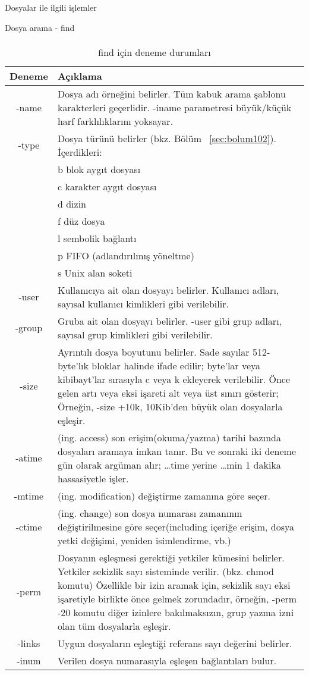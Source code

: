 \begin{section}{Dosyalar ile ilgili işlemler}
\begin{subsection}{Dosya arama - find}
\paragraph{}{
\begin {table}[H]
\caption {find için deneme durumları} \label{tab:tablo66} 
\begin{tabular}{c l}
\hline
Deneme & Açıklama \\
\hline
-name & Dosya adı örneğini belirler. Tüm kabuk arama şablonu karakterleri geçerlidir. -iname parametresi büyük/küçük harf farklılıklarını yoksayar. \\
-type & Dosya türünü belirler (bkz. Bölüm ~\ref{sec:bolum102}). İçerdikleri:\\
 & b blok aygıt dosyası\\
 & c karakter aygıt dosyası\\
 & d dizin\\
 & f düz dosya\\
 & l sembolik bağlantı\\
 & p FIFO (adlandırılmış yöneltme)\\
 & s Unix alan soketi\\
-user & Kullanıcıya ait olan dosyayı belirler. Kullanıcı adları, sayısal kullanıcı kimlikleri gibi verilebilir.\\
-group & Gruba ait olan dosyayı belirler. -user gibi grup adları, sayısal grup kimlikleri gibi verilebilir.\\
-size & Ayrıntılı dosya boyutunu belirler. Sade sayılar 512-byte'lık bloklar halinde ifade edilir; byte'lar veya kibibayt'lar sırasıyla c veya k ekleyerek verilebilir. Önce gelen artı veya eksi işareti alt veya üst sınırı gösterir; Örneğin, -size +10k, 10Kib'den büyük olan dosyalarla eşleşir.\\
-atime & (ing. access) son erişim(okuma/yazma) tarihi bazında dosyaları aramaya imkan tanır.  Bu ve sonraki iki deneme gün olarak argüman alır; …time yerine …min 1 dakika hassasiyetle işler.\\
-mtime & (ing. modification) değiştirme zamanına göre seçer.\\
-ctime & (ing. change) son dosya numarası zamanının değiştirilmesine göre seçer(including içeriğe erişim, dosya yetki değişimi, yeniden isimlendirme, vb.)\\
-perm & Dosyanın eşleşmesi gerektiği yetkiler kümesini belirler. Yetkiler sekizlik sayı sisteminde verilir. (bkz. chmod komutu)
Özellikle bir izin aramak için, sekizlik sayı eksi işaretiyle birlikte önce gelmek zorundadır, örneğin, -perm -20 komutu diğer izinlere bakılmaksızın, grup yazma izni olan tüm dosyalarla eşleşir.\\
-links & Uygun dosyaların eşleştiği referans sayı değerini belirler.\\
-inum & Verilen dosya numarasıyla eşleşen bağlantıları bulur.\\
\hline
\end{tabular}
\end {table}
}

\end{subsection}
\end{section}
